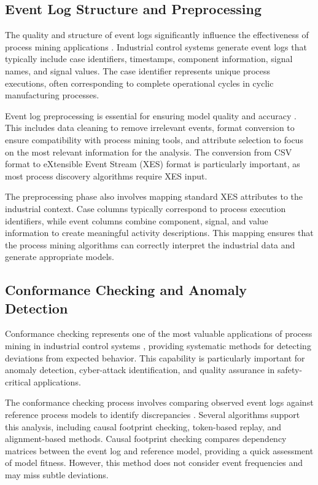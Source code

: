 \subsection{Event Log Structure and Preprocessing}

The quality and structure of event logs significantly influence the effectiveness of process mining applications \cite{paper2}. Industrial control systems generate event logs that typically include case identifiers, timestamps, component information, signal names, and signal values. The case identifier represents unique process executions, often corresponding to complete operational cycles in cyclic manufacturing processes.

Event log preprocessing is essential for ensuring model quality and accuracy \cite{van2005prom}. This includes data cleaning to remove irrelevant events, format conversion to ensure compatibility with process mining tools, and attribute selection to focus on the most relevant information for the analysis. The conversion from CSV format to eXtensible Event Stream (XES) format is particularly important, as most process discovery algorithms require XES input.


The preprocessing phase also involves mapping standard XES attributes to the industrial context. Case columns typically correspond to process execution identifiers, while event columns combine component, signal, and value information to create meaningful activity descriptions. This mapping ensures that the process mining algorithms can correctly interpret the industrial data and generate appropriate models.

\subsection{Conformance Checking and Anomaly Detection}

Conformance checking represents one of the most valuable applications of process mining in industrial control systems \cite{dunzer2019conformance}, providing systematic methods for detecting deviations from expected behavior. This capability is particularly important for anomaly detection, cyber-attack identification, and quality assurance in safety-critical applications.

The conformance checking process involves comparing observed event logs against reference process models to identify discrepancies \cite{van2012replaying}. Several algorithms support this analysis, including causal footprint checking, token-based replay, and alignment-based methods. Causal footprint checking compares dependency matrices between the event log and reference model, providing a quick assessment of model fitness. However, this method does not consider event frequencies and may miss subtle deviations.

